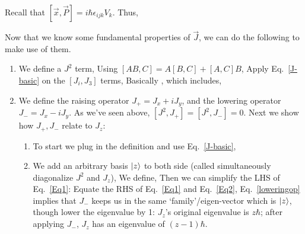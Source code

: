 \documentclass{school-22.101-notes}
\begin{document}
Recall that $[\vec{x}, \vec{P} ] = i \hbar \epsilon_{ijk} V_k$. Thus, 

\clearpage
Now that we know some fundamental properties of $\vec{J}$, we can do the following to make use of them.
\begin{enumerate}
\item We define a $J^2$ term,
  Using $[AB,C] = A[B,C] + [A,C] B$, 
  Apply Eq.~\ref{J-basic} on the $[J_i, J_3]$ terms,
  Basically , 
  which includes, 

\item We define the raising operator $J_+ = J_x + iJ_y$, and the lowering operator $J_- = J_x - iJ_y$. As we've seen above, $[J^2, J_+] = [J^2, J_-] = 0$. Next we show how $J_+, J_-$ relate to $J_z$: 
  \begin{enumerate}
  \item To start we plug in the definition and use Eq.~\ref{J-basic}, 


  \item We add an arbitrary basis $\left| z \right>$ to both side (called simultaneously diagonalize $J^2$ and $J_z$),  
    We define, 
    Then we can simplify the LHS of Eq.~\ref{Eq1}: 
    Equate the RHS of Eq.~\ref{Eq1} and Eq.~\ref{Eq2}, 
    Eq.~\ref{loweringop} implies that $J_-$ keeps us in the same `family'/eigen-vector which is $\left| z \right>$, though lower the eigenvalue by 1: $J_z$'s original eigenvalue is $z\hbar$; after applying $J_-$, $J_z$ has an eigenvalue of $(z-1) \hbar$. 
    

\end{enumerate}
\end{enumerate}
\end{document}
